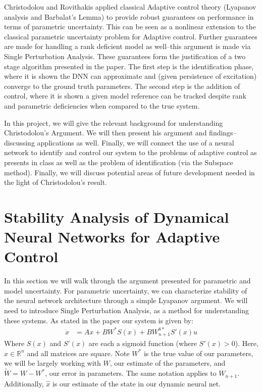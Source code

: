 \documentclass[12pt, letterpaper]{article}
\begin{document}
		Christodolou and Rovithakis applied classical Adaptive control theory (Lyapanov analysis and Barbalat's Lemma)  to provide robust guarantees on performance in terms of parametric uncertainty. This can be seen as a nonlinear extension to the classical parametric uncertainty problem for Adaptive control. Further guarantees are made for handling a rank deficient model as well--this argument is made via Single Perturbation Analysis. These guarantees form the justification of a two stage algorithm presented in the paper. The first step is the identification phase, where it is shown the DNN can approximate and (given persistence of excitation) converge to the ground truth parameters. The second step is the addition of control, where it is shown a given model reference can be tracked despite rank and parametric deficiencies when compared to the true system.
			
		In this project, we will give the relevant background for understanding Christodolou's Argument. We will then present his argument and findings--discussing applications as well. Finally, we will connect the use of a neural network to  identify and control our system to the problems of adaptive control as presents in class as well as the problem of identification (via the Subspace method\cite{Verhaegen2013}). Finally, we will discuss potential areas of future development needed in the light of Christodolou's result.
			
	\section{Stability Analysis of Dynamical Neural Networks for Adaptive Control}
	
	In this section we will walk through the argument presented for parametric and model uncertainty. For parametric uncertainty, we can characterize stability of the neural network architecture through a simple Lyapanov argument. We will need to introduce Single Perturbation Analysis, as a method for understanding these systems. As stated in the paper our system is given by:
	\begin{align}
		\dot{x} &= Ax +BW^{*}S(x)+BW^{8*}_{n+1}S'(x)u 
		\label{system}
	\end{align}
	Where $S(x)$ and $S'(x)$ are each a sigmoid function (where $S'(x) >0 $). Here, $x \in \mathbb{R}^{n}$ and all matrices are square. Note $W^{*}$ is the true value of our parameters, we will be largely working with $W$, our estimate of the parameters, and $\tilde{W} = W-W^{*}$, our error in parameters. The same notation applies to $W_{n+1}$. Additionally, $\hat{x}$ is our estimate of the state in our dynamic neural net.
\end{document}
